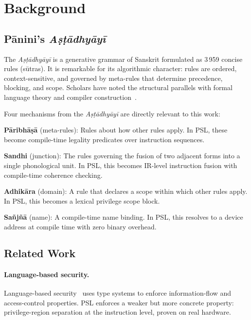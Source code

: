 \documentclass[11pt,a4paper]{article}
\begin{document}
\section{Background}
\label{sec:background}

\subsection{P\={a}nini's \emph{A\d{s}\d{t}\={a}dhy\={a}y\={i}}}

The \emph{A\d{s}\d{t}\={a}dhy\={a}y\={i}} is a generative grammar of
Sanskrit formulated as 3\,959 concise rules (s\={u}tras). It is remarkable
for its algorithmic character: rules are ordered, context-sensitive, and
governed by meta-rules that determine precedence, blocking, and scope.
Scholars have noted the structural parallels with formal language theory and
compiler construction~\cite{ingerman1967panini,kadvany2016panini}.

Four mechanisms from the \emph{A\d{s}\d{t}\={a}dhy\={a}y\={i}} are directly
relevant to this work:

\textbf{P\={a}ribh\={a}\d{s}\={a}} (meta-rules): Rules about how other rules
apply. In PSL, these become compile-time legality predicates over instruction
sequences.

\textbf{Sandhi} (junction): The rules governing the fusion of two adjacent
forms into a single phonological unit. In PSL, this becomes IR-level
instruction fusion with compile-time coherence checking.

\textbf{Adhi\-k\={a}ra} (domain): A rule that declares a scope within which
other rules apply. In PSL, this becomes a lexical privilege scope block.

\textbf{Sa\~{n}j\~{n}\={a}} (name): A compile-time name binding. In PSL,
this resolves to a device address at compile time with zero binary overhead.

\subsection{Related Work}

\paragraph{Language-based security.}
{\sloppy
Language-based security~\cite{sabelfeld2003language} uses type systems to
enforce information-flow and access-control properties. PSL enforces a
weaker but more concrete property: privilege-region separation at the
instruction level, proven on real hardware.
\par}
\end{document}
